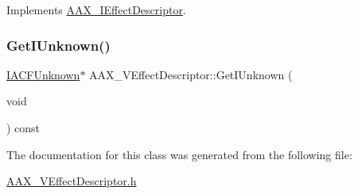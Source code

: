 Implements \mbox{\hyperlink{a01813_aa7709de005e0256feb522758ccc5b582}{A\+A\+X\+\_\+\+I\+Effect\+Descriptor}}.

\mbox{\label{a01913_a7f968960469f22f5cbb702bad52f6d7e}} 
\subsubsection{\texorpdfstring{GetIUnknown()}{GetIUnknown()}}
{\footnotesize\ttfamily \mbox{\hyperlink{a01409}{I\+A\+C\+F\+Unknown}}$\ast$ A\+A\+X\+\_\+\+V\+Effect\+Descriptor\+::\+Get\+I\+Unknown (\begin{DoxyParamCaption}\item[{void}]{ }\end{DoxyParamCaption}) const}



The documentation for this class was generated from the following file\+:\begin{DoxyCompactItemize}
\item 
\mbox{\hyperlink{a00704}{A\+A\+X\+\_\+\+V\+Effect\+Descriptor.\+h}}\end{DoxyCompactItemize}
